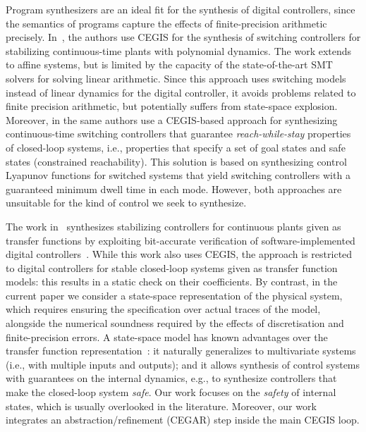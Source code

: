\documentclass[twocolumn]{autart}    %
\begin{document}
Program synthesizers are an ideal fit for the synthesis of digital controllers, since
the semantics of programs capture the effects of finite-precision arithmetic
precisely.  In~\cite{DBLP:conf/cdc/RavanbakhshS15}, the authors use CEGIS
for the synthesis of switching controllers for stabilizing continuous-time
plants with polynomial dynamics.  The work extends to affine systems, but is
limited by the capacity of the state-of-the-art SMT solvers for solving
linear arithmetic.  Since this approach uses switching models instead of
linear dynamics for the digital controller, it avoids problems related to
finite precision arithmetic, but potentially suffers from state-space
explosion.  Moreover, in \cite{DBLP:conf/emsoft/RavanbakhshS16} the same
authors use a CEGIS-based approach for synthesizing continuous-time
switching controllers that guarantee \emph{reach-while-stay} properties of
closed-loop systems, i.e., properties that specify a set of goal states and
safe states (constrained reachability).  This solution is based on
synthesizing control Lyapunov functions for switched systems that yield
switching controllers with a guaranteed minimum dwell time in each mode. 
However, both approaches are unsuitable for the kind of control we seek to
synthesize.

The work in~\cite{hscc-paper} synthesizes stabilizing controllers for
continuous plants given as transfer functions by exploiting bit-accurate
verification of software-implemented digital controllers~\cite{Bessa16}. 
While this work also uses CEGIS, the approach is restricted to digital
controllers for stable closed-loop systems given as transfer function
models: this results in a static check on their coefficients.  By contrast,
in the current paper we consider a state-space representation of the
physical system, which requires ensuring the specification over actual
traces of the model, alongside the numerical soundness required by the
effects of discretisation and finite-precision errors.  A state-space model
has known advantages over the transfer function
representation~\cite{Franklin15}: it naturally generalizes to multivariate
systems (i.e., with multiple inputs and outputs); and it allows synthesis of
control systems with guarantees on the internal dynamics, e.g., to
synthesize controllers that make the closed-loop system \emph{safe}.  Our
work focuses on the \emph{safety} of internal states, which is usually
overlooked in the literature.  Moreover, our work integrates an
abstraction/refinement (CEGAR) step inside the main CEGIS loop.
\end{document}

